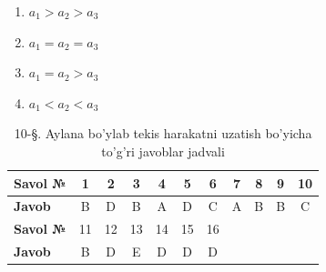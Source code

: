 \begin{enumerate}

\begin{enumerate}[label=\Alph*)]
\item $a_1 > a_2 > a_3$
\item $a_1 = a_2 = a_3$
\item $a_1 = a_2 > a_3$
\item $a_1 < a_2 < a_3$
\end{enumerate}

\end{enumerate}


\begin{table}[h!]
\centering
\caption{10-§. Aylana bo'ylab tekis harakatni uzatish bo'yicha to'g'ri javoblar jadvali}
\begin{tabular}{|l|c|c|c|c|c|c|c|c|c|c|}
\hline
\textbf{Savol №} & 1 & 2 & 3 & 4 & 5 & 6 & 7 & 8 & 9 & 10 \\ \hline
\textbf{Javob}   & B & D & B & A & D & C & A & B & B & C \\ \hline
\hline
\textbf{Savol №} & 11 & 12 & 13 & 14 & 15 & 16 &  & & & \\ \hline
\textbf{Javob}   & B & D & E & D & D & D &  & & & \\ \hline
\end{tabular}
\end{table}

